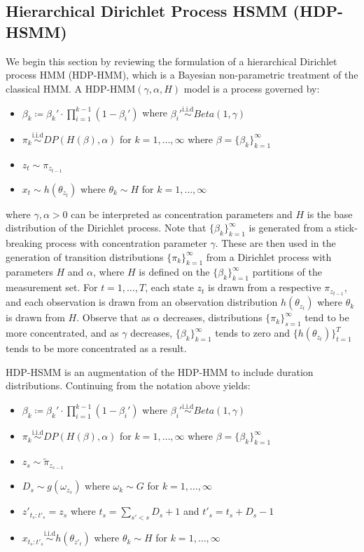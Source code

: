 \documentclass{article}
\begin{document}
\subsection{Hierarchical Dirichlet Process HSMM (HDP-HSMM)}
We begin this section by reviewing the formulation of a hierarchical Dirichlet process HMM (HDP-HMM), which is a Bayesian non-parametric treatment of the classical HMM. A HDP-HMM$(\gamma, \alpha, H)$ model is a process governed by:
\begin{itemize}
  \item $\beta_k \coloneqq \beta_k'\cdot \prod_{i=1}^{k-1} (1-\beta_i')$ where $\beta_i' \overset{\text{i.i.d}}{\sim} Beta(1,\gamma)$
  \item $\pi_k \overset{\text{i.i.d}}{\sim} DP(H(\beta), \alpha)$ for $k = 1, \dots, \infty$ where $\beta = \{\beta_k\}_{k=1}^{\infty}$
  \item $z_t \sim \pi_{z_{t-1}}$
  \item $x_t \sim h(\theta_{z_t})$ where $\theta_{k} \sim H$ for $k = 1, \dots, \infty$
\end{itemize}
where $\gamma, \alpha > 0$ can be interpreted as concentration parameters and $H$ is the base distribution of the Dirichlet process. Note that $\{\beta_k\}_{k=1}^{\infty}$ is generated from a stick-breaking process with concentration parameter $\gamma$. These are then used in the generation of  transition distributions $\{\pi_k \}_{k=1}^{\infty}$ from a Dirichlet process with parameters $H$ and $\alpha$, where $H$ is defined on the $\{\beta_k\}_{k=1}^{\infty}$ partitions of the measurement set. For $t = 1, \dots, T$, each state $z_t$ is drawn from a respective $\pi_{z_{t-1}}$, and each observation is drawn from an observation distribution $h(\theta_{z_t})$ where $\theta_{k}$ is drawn from $H$. Observe that as $\alpha$ decreases, distributions $\{\pi_k\}_{s=1}^{\infty}$ tend to be more concentrated, and as $\gamma$ decreases, $\{\beta_k\}_{k=1}^{\infty}$ tends to zero and $\{h(\theta_{z_t})\}_{t=1}^{T}$ tends to be more concentrated as a result.

HDP-HSMM is an augmentation of the HDP-HMM to include duration distributions. Continuing from the notation above yields:
\begin{itemize}
  \item $\beta_k \coloneqq \beta_k'\cdot \prod_{i=1}^{k-1} (1-\beta_i')$ where $\beta_i' \overset{\text{i.i.d}}{\sim} Beta(1,\gamma)$
  \item $\pi_k \overset{\text{i.i.d}}{\sim} DP(H(\beta), \alpha)$ for $k = 1, \dots, \infty$ where $\beta = \{\beta_k\}_{k=1}^{\infty}$
  \item $z_s \sim \tilde{\pi}_{z_{s-1}}$
  \item $D_s \sim g(\omega_{z_s})$ where $\omega_k \sim G$ for $k = 1, \dots, \infty$
  \item $z'_{t_{s}:t'_{s}} = z_s$ where $t_{s} = \sum_{s' < s} D_s + 1$ and $t'_{s} = t_{s} + D_s - 1$
  \item $x_{t_{s}: t'_{s}} \overset{\text{i.i.d}}{\sim} h(\theta_{z'_t})$ where $\theta_{k} \sim H$ for $k = 1, \dots, \infty$
\end{itemize}
\end{document}
